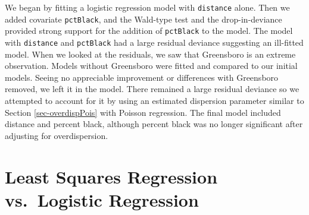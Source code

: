 \documentclass[
]{krantz}
\begin{document}
We began by fitting a logistic regression model with \texttt{distance} alone. Then we added covariate \texttt{pctBlack}, and the Wald-type test and the drop-in-deviance provided strong support for the addition of \texttt{pctBlack} to the model. The model with \texttt{distance} and \texttt{pctBlack} had a large residual deviance suggesting an ill-fitted model. When we looked at the residuals, we saw that Greensboro is an extreme observation. Models without Greensboro were fitted and compared to our initial models. Seeing no appreciable improvement or differences with Greensboro removed, we left it in the model. There remained a large residual deviance so we attempted to account for it by using an estimated dispersion parameter similar to Section \ref{sec-overdispPois} with Poisson regression. The final model included distance and percent black, although percent black was no longer significant after adjusting for overdispersion.

\hypertarget{least-squares-regression-vs.-logistic-regression}{%
\section{Least Squares Regression vs.~Logistic Regression}\label{least-squares-regression-vs.-logistic-regression}}
\end{document}
